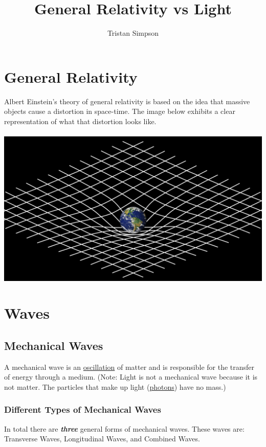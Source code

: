 \documentclass{article}
\title{General Relativity vs Light}
\author{Tristan Simpson}
\begin{document}
\maketitle
\tableofcontents
\section{General Relativity}\label{sec:generalrelativity}
Albert Einstein's theory of general relativity is based on the idea that massive objects cause a distortion in space-time. The image below exhibits a clear representation of what that distortion looks like.\\\\
\includegraphics[scale=0.30]{images/general_relativity.png}

\section{Waves}
\subsection{Mechanical Waves}
A mechanical wave is an \hyperref[sec:oscillation]{oscillation} of matter and is responsible for the transfer of energy through a medium. (Note: Light is not a mechanical wave because it is not matter. The particles that make up light (\hyperref[sec:photons]{photons}) have no mass.)

\subsubsection{Different Types of Mechanical Waves}
In total there are \textbf{\textit{three}} general forms of mechanical waves. These waves are: Transverse Waves, Longitudinal Waves, and Combined Waves.
\end{document}
